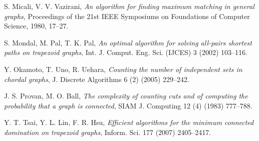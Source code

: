 \documentclass[11pt,letter]{article}
\begin{document}
\begin{thebibliography}{99}
    S. Micali, V. V. Vazirani,
    \emph{An  algorithm for finding maximum matching in general graphs},
    Proceedings of the 21st IEEE Symposiums on Foundations of Computer Science, 1980, 17--27.

     S. Mondal, M. Pal, T. K. Pal,
     \emph{An optimal algorithm for solving all-pairs shortest paths on trapezoid graphs},
     Int. J. Comput. Eng. Sci. (IJCES) 3 (2002) 103--116.

    Y. Okamoto, T. Uno, R. Uehara,
    \emph{Counting the number of independent sets in chordal graphs},
    J. Discrete Algorithms 6 (2) (2005) 229--242.

    J. S. Provan, M. O. Ball,
    \emph{The complexity of counting cuts and of computing the probability that a graph is connected},
    SIAM J. Computing 12 (4) (1983) 777--788.

    Y. T. Tsai, Y. L. Lin, F. R. Hsu,
    \emph{Efficient algorithms for the minimum connected domination on trapezoid graphs},
    Inform. Sci. 177 (2007) 2405--2417.


\end{thebibliography}
\end{document}
